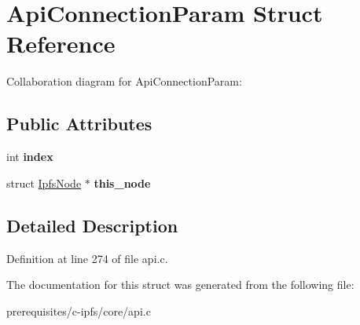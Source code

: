 \hypertarget{struct_api_connection_param}{}\section{Api\+Connection\+Param Struct Reference}
\label{struct_api_connection_param}


Collaboration diagram for Api\+Connection\+Param\+:
\subsection*{Public Attributes}
\begin{DoxyCompactItemize}
\item 
\mbox{\label{struct_api_connection_param_a07be52140acc020f2ab28538c7fac3de}} 
int {\bfseries index}
\item 
\mbox{\label{struct_api_connection_param_a43adf29db125394b59ba5f66a213ac71}} 
struct \mbox{\hyperlink{struct_ipfs_node}{Ipfs\+Node}} $\ast$ {\bfseries this\+\_\+node}
\end{DoxyCompactItemize}


\subsection{Detailed Description}


Definition at line 274 of file api.\+c.



The documentation for this struct was generated from the following file\+:\begin{DoxyCompactItemize}
\item 
prerequisites/c-\/ipfs/core/api.\+c\end{DoxyCompactItemize}
